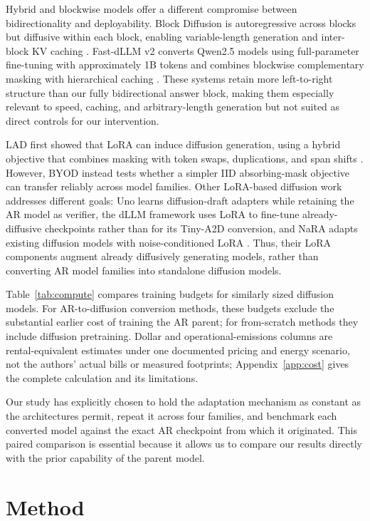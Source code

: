 \documentclass{article}
\newcommand{\method}{BYOD}
\begin{document}
Hybrid and blockwise models offer a different compromise between bidirectionality and deployability. Block Diffusion is autoregressive across blocks but diffusive within each block, enabling variable-length generation and inter-block KV caching \citep{arriola2025block}. Fast-dLLM v2 converts Qwen2.5 models using full-parameter fine-tuning with approximately 1B tokens and combines blockwise complementary masking with hierarchical caching \citep{wu2025fastdllmv2}. These systems retain more left-to-right structure than our fully bidirectional answer block, making them especially relevant to speed, caching, and arbitrary-length generation but not suited as direct controls for our intervention.

LAD first showed that LoRA can induce diffusion generation, using a hybrid objective that combines masking with token swaps, duplications, and span shifts \citep{kuiper2025lad,hu2022lora}. However, \method{} instead tests whether a simpler IID absorbing-mask objective can transfer reliably across model families. Other LoRA-based diffusion work addresses different goals: Uno learns diffusion-draft adapters while retaining the AR model as verifier, the dLLM framework uses LoRA to fine-tune already-diffusive checkpoints rather than for its Tiny-A2D conversion, and NaRA adapts existing diffusion models with noise-conditioned LoRA \citep{sahoo2026uno,zhou2026dllm,wang2026nara}. Thus, their LoRA components augment already diffusively generating models, rather than converting AR model families into standalone diffusion models.

Table~\ref{tab:compute} compares training budgets for similarly sized diffusion models. For AR-to-diffusion conversion methods, these budgets exclude the substantial earlier cost of training the AR parent; for from-scratch methods they include diffusion pretraining. Dollar and operational-emissions columns are rental-equivalent estimates under one documented pricing and energy scenario, not the authors' actual bills or measured footprints; Appendix~\ref{app:cost} gives the complete calculation and its limitations.

Our study has explicitly chosen to hold the adaptation mechanism as constant as the architectures permit, repeat it across four families, and benchmark each converted model against the exact AR checkpoint from which it originated. This paired comparison is essential because it allows us to compare our results directly with the prior capability of the parent model.

\section{Method}
\end{document}
